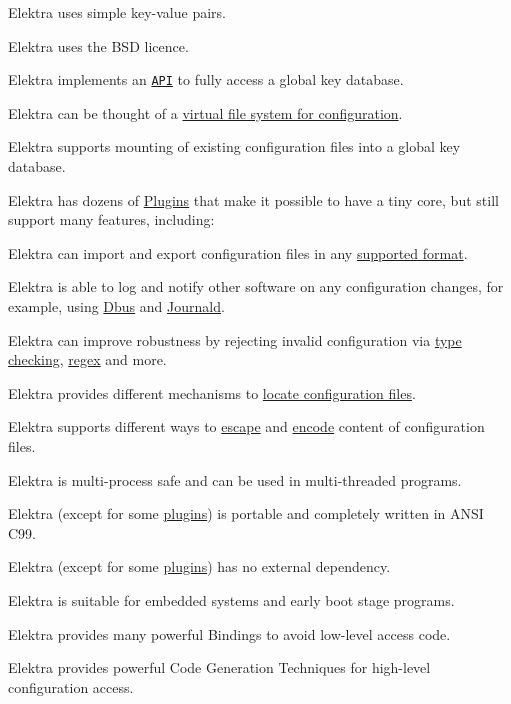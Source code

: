 \begin{DoxyItemize}
\item Elektra uses simple key-\/value pairs.
\item Elektra uses the B\+SD licence.
\item Elektra implements an \href{https://doc.libelektra.org/api/latest/html/}{\tt A\+PI} to fully access a global key database.
\item Elektra can be thought of a \hyperlink{doc_BIGPICTURE_md}{virtual file system for configuration}.
\item Elektra supports mounting of existing configuration files into a global key database.
\item Elektra has dozens of \hyperlink{md_src_plugins_README_src_plugins_README_md}{Plugins} that make it possible to have a tiny core, but still support many features, including\+:
\begin{DoxyItemize}
\item Elektra can import and export configuration files in any \hyperlink{md_src_plugins_README_src_plugins_README_md}{supported format}.
\item Elektra is able to log and notify other software on any configuration changes, for example, using \hyperlink{md_src_plugins_dbus_README_src_plugins_dbus_README_md}{Dbus} and \hyperlink{md_src_plugins_journald_README_src_plugins_journald_README_md}{Journald}.
\item Elektra can improve robustness by rejecting invalid configuration via \hyperlink{md_src_plugins_type_README_src_plugins_type_README_md}{type checking}, \hyperlink{md_src_plugins_validation_README_src_plugins_validation_README_md}{regex} and more.
\item Elektra provides different mechanisms to \hyperlink{md_src_plugins_resolver_README_src_plugins_resolver_README_md}{locate configuration files}.
\item Elektra supports different ways to \hyperlink{md_src_plugins_ccode_README_src_plugins_ccode_README_md}{escape} and \hyperlink{md_src_plugins_iconv_README_src_plugins_iconv_README_md}{encode} content of configuration files.
\end{DoxyItemize}
\item Elektra is multi-\/process safe and can be used in multi-\/threaded programs.
\item Elektra (except for some \hyperlink{md_src_plugins_README_src_plugins_README_md}{plugins}) is portable and completely written in A\+N\+SI C99.
\item Elektra (except for some \hyperlink{md_src_plugins_README_src_plugins_README_md}{plugins}) has no external dependency.
\item Elektra is suitable for embedded systems and early boot stage programs.
\item Elektra provides many powerful Bindings to avoid low-\/level access code.
\item Elektra provides powerful Code Generation Techniques for high-\/level configuration access.
\end{DoxyItemize}

